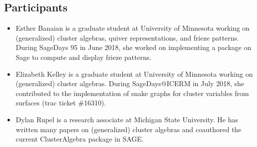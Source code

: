 \documentclass{amsart}
\begin{document}
  \subsection*{Participants}
  \begin{itemize}
    \item Esther Banaian is a graduate student at University of Minnesota working on (generalized) cluster algebras, quiver representations, and frieze patterns. During SageDays 95 in June 2018, she worked on implementing a package on Sage to compute and display frieze patterns. 
    \item Elizabeth Kelley is a graduate student at University of Minnesota working on (generalized) cluster algebras.  During SageDays@ICERM in July 2018, she contributed to the implementation of snake graphs for cluster variables from surfaces (trac ticket \#16310).
    \item Dylan Rupel is a research associate at Michigan State University.
      He has written many papers on (generalized) cluster algebras and coauthored the current ClusterAlgebra package in SAGE.
  \end{itemize}
\end{document}
